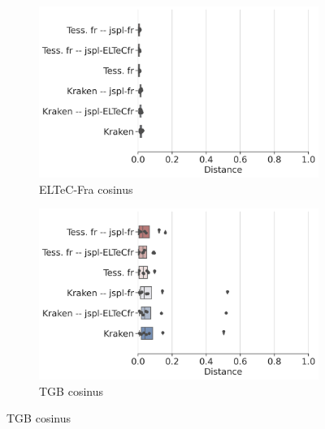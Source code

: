 \begin{figure}[h!]
   \centering
      \begin{subfigure}{0.45\textwidth}
  \includegraphics[height=.65\textwidth]{IMAGES/Boite-moustache/ELTeC-Fra_REF_cosinus.png} 
        \caption{ELTeC-Fra cosinus}
        \label{fig:ELTeC-Fra_REF_cosinus}
   \end{subfigure}
       \begin{subfigure}{0.5\textwidth}
  \includegraphics[height=.65\textwidth]{IMAGES/Boite-moustache/TGB_REF_cosinus.png} 
        \caption{TGB cosinus}
   \end{subfigure}
   

\end{figure}
